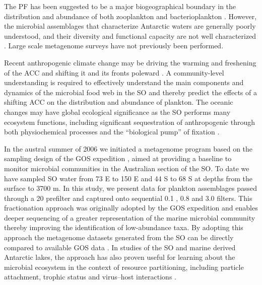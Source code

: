 The \ac{PF} has been suggested to be a major biogeographical boundary in the distribution and abundance of both zooplankton \cite{Chiba:2001un,Hunt:2001vp,Esper:2002ui,Ward:2003db} and bacterioplankton \cite{Selje:2004ka,Abell:2005ji,Giebel:2009hr,Weber:2010fi}.
However, the microbial assemblages that characterize Antarctic waters are generally poorly understood, and their diversity and functional capacity are not well characterized \citep[reviewed in][]{Murray:2007db,Wilkins:2012ii}.
Large scale metagenome surveys have not previously been performed.

Recent anthropogenic climate change may be driving the warming and freshening of the \ac{ACC} \cite{Boning:2008il} and shifting it and its fronts poleward \cite{Fyfe:2005vp,Biastoch:2009fz}.
A community-level understanding is required to effectively understand the main components and dynamics of the microbial food web in the \ac{SO} and thereby predict the effects of a shifting \ac{ACC} on the distribution and abundance of plankton.
The oceanic changes may have global ecological significance as the \ac{SO} performs many ecosystem functions, including significant sequestration of anthropogenic  \cite{Sabine:2004fz,MikaloffFletcher:2006ct} through both physiochemical processes and the ``biological pump'' of  fixation \cite{Thomalla:2011hi}.

In the austral summer of 2006 we initiated a metagenome program based on the sampling design of the \ac{GOS} expedition \cite{Rusch:2007ez}, aimed at providing a baseline to monitor microbial communities in the Australian section of the \ac{SO}.
To date we have sampled \ac{SO} water from 73\textdegree{} E to 150\textdegree{} E and 44\textdegree{} S to 68\textdegree{} S at depths from the surface to \textapprox{} 3700 m.
In this study, we present data for plankton assemblages passed through a 20 \micron{} prefilter and captured onto sequential 0.1 \micron, 0.8 \micron{} and 3.0 \micron{} filters.
This fractionation approach was originally adopted by the \ac{GOS} expedition \cite{Rusch:2007ez} and enables deeper sequencing of a greater representation of the marine microbial community thereby improving the identification of low-abundance taxa.
By adopting this approach the metagenome datasets generated from the \ac{SO} can be directly compared to available \ac{GOS} data \citep[e.g.][]{Brown:2012gna}.
In studies of the \ac{SO} and marine derived Antarctic lakes, the approach has also proven useful for learning about the microbial ecosystem in the context of resource partitioning, including particle attachment, trophic status and virus–host interactions \cite{Ng:2010cd,Lauro:2010jna,Yau:2011eb,Williams:2012gsa}.

